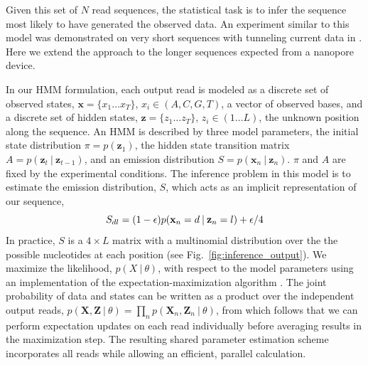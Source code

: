\documentclass{biophys_letter}
\begin{document}
Given this set of $N$ read sequences, the statistical task is to infer the sequence most likely to have generated the observed data.
An experiment similar to this model was demonstrated on very short sequences with tunneling current data in \cite{Ohshiro:2012}.
Here we extend the approach to the longer sequences expected from a nanopore device.


In our HMM formulation, each output read is modeled as a discrete set of observed states, $\mathbf{x}=\{x_{1}\dots x_{T}\}$, $x_i \in (A,C,G,T)$, a vector of observed bases, and a discrete set of hidden states, $\mathbf{z}=\{z_{1} \dots z_{T}\}$, $z_i \in (1 \dots L)$, the unknown position along the sequence.
An HMM is described by three model parameters, the initial state distribution $\pi=p(\mathbf{z}_{1})$, the hidden state transition matrix $A=p(\mathbf{z}_{t}\:|\:\mathbf{z}_{t-1})$, and an emission distribution $S=p(\mathbf{x}_{n}\:|\:\mathbf{z}_{n})$. 
$\pi$ and $A$ are fixed by the experimental conditions. 
The inference problem in this model is to estimate the emission distribution, $S$, which acts as an implicit representation of our sequence,
\begin{equation}
  S_{dl} = (1-\epsilon)p(\mathbf{x}_n = d\:|\:\mathbf{z}_{n} = l) + \epsilon/4 
\end{equation}
In practice, $S$ is a $4 \times L$ matrix with a multinomial distribution over the the possible nucleotides at each position (see Fig.~\ref{fig:inference_output}).
We maximize the likelihood, $p(X \:|\: \theta)$, with respect to the model parameters using an implementation of the expectation-maximization algorithm \cite{Baum:1970,Bishop:2006}.
The joint probability of data and states can be written as a product over the independent output reads, $p(\mathbf{X},\mathbf{Z}\:|\:\theta)=\prod_{n}p(\mathbf{X}_n,\mathbf{Z}_n\:|\:\theta)$, from which follows that we can perform expectation updates on each read individually before averaging results in the maximization step.
The resulting shared parameter estimation scheme incorporates all reads while allowing an efficient, parallel calculation.
\end{document}
